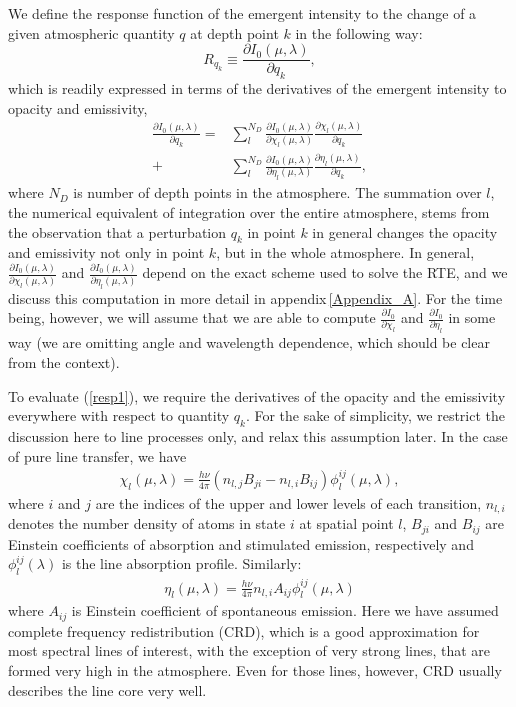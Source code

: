 \documentclass[referee]{aa}
\begin{document}
We define the response function of the emergent intensity to the change of a given atmospheric quantity $q$ at depth point $k$ in the following way:
\begin{equation}
 R_{q_k} \equiv \frac{\partial I_0(\mu,\lambda)}{\partial q_k},
\end{equation}
which is readily expressed in terms of the derivatives of the emergent intensity to opacity and emissivity, 
\begin{align}
 \frac{\partial I_0(\mu,\lambda)}{\partial q_k} = & \sum_l^{N_D} \frac{\partial I_0(\mu,\lambda)}{\partial \chi_l(\mu,\lambda)} \frac{\partial \chi_l(\mu,\lambda)}{\partial q_k} \nonumber \\
 + & \sum_l^{N_D} \frac{\partial I_0(\mu,\lambda)}{\partial \eta_l(\mu,\lambda)} \frac{\partial \eta_l(\mu,\lambda)}{\partial q_k},
 \label{resp1}
\end{align}
where $N_D$ is number of depth points in the atmosphere. The summation over $l$, the numerical equivalent of integration over the entire atmosphere, stems from the observation that a perturbation $q_k$ in point $k$ in general changes the opacity and emissivity not only in point $k$, but in the whole atmosphere. In general, $\frac{\partial I_0(\mu,\lambda)}{\partial \chi_l(\mu,\lambda)}$ and $\frac{\partial I_0(\mu,\lambda)}{\partial \eta_l(\mu,\lambda)}$ depend on the exact scheme used to solve the RTE, and we discuss this computation in more detail in appendix\,\ref{Appendix_A}. For the time being, however, we will assume that we are able to compute $\frac{\partial I_0}{\partial \chi_l}$ and $\frac{\partial I_0}{\partial \eta_l}$ in some way (we are omitting angle and wavelength dependence, which should be clear from the context).

To evaluate (\ref{resp1}), we require the derivatives of the opacity and the emissivity everywhere with respect to quantity $q_k$. For the sake of simplicity, we restrict the discussion here to line processes only, and relax this assumption later. In the case of pure line transfer, we have
\begin{align}
 \chi_l(\mu,\lambda) = \frac{h\nu}{4\pi}(n_{l,j} B_{ji} - n_{l,i}B_{ij}) \phi^{ij}_l(\mu,\lambda),
\end{align}
where $i$ and $j$ are the indices of the upper and lower levels of each transition, $n_{l,i}$ denotes the number density of atoms in state $i$ at spatial point $l$, $B_{ji}$ and $B_{ij}$ are Einstein coefficients of absorption and stimulated emission, respectively and $\phi^{ij}_l(\lambda)$ is the line absorption profile. Similarly:
\begin{align}
 \eta_l(\mu,\lambda) = \frac{h\nu}{4\pi}n_{l,i}A_{ij} \phi^{ij}_l(\mu,\lambda) 
\end{align}
where $A_{ij}$ is Einstein coefficient of spontaneous emission. Here we have assumed complete frequency redistribution (CRD), which is a good approximation for most spectral lines of interest, with the exception of very strong lines, that are formed very high in the atmosphere. Even for those lines, however, CRD usually describes the line core very well.
\end{document}
